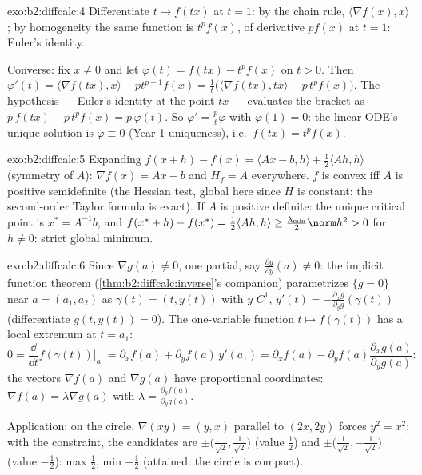 \begin{solution}{exo:b2:diffcalc:4}
Differentiate $t \mapsto f(tx)$ at $t = 1$: by the chain rule,
$\langle \nabla f(x), x\rangle$; by homogeneity the same function
is $t^pf(x)$, of derivative $pf(x)$ at $t = 1$: Euler's identity.

Converse: fix $x \neq 0$ and let $\varphi(t) = f(tx) - t^p f(x)$
on $t > 0$. Then $\varphi'(t) = \langle\nabla f(tx), x\rangle -
pt^{p-1}f(x) = \frac1t\bigl(\langle \nabla f(tx), tx\rangle -
p\,t^pf(x)\bigr)$. The hypothesis --- Euler's identity at the point
$tx$ --- evaluates the bracket as $p\,f(tx) - p\,t^pf(x) =
p\,\varphi(t)$. So $\varphi' = \frac{p}{t}\varphi$ with $\varphi(1)
= 0$: the linear ODE's unique solution is $\varphi \equiv 0$ (Year
1 uniqueness), i.e.\ $f(tx) = t^pf(x)$.
\end{solution}

\begin{solution}{exo:b2:diffcalc:5}
Expanding $f(x + h) - f(x) = \langle Ax - b, h\rangle +
\frac12\langle Ah, h\rangle$ (symmetry of $A$): $\nabla f(x) = Ax -
b$ and $H_f = A$ everywhere. $f$ is convex iff $A$ is positive
semidefinite (the Hessian test, global here since $H$ is constant:
the second-order Taylor formula is exact). If $A$ is positive
definite: the unique critical point is $x^* = A^{-1}b$, and $f(x^*
+ h) - f(x^*) = \frac12\langle Ah, h\rangle \geq
\frac{\lambda_{\min}}{2}\norm h^2 > 0$ for $h \neq 0$: strict
global minimum.
\end{solution}

\begin{solution}{exo:b2:diffcalc:6}
Since $\nabla g(a) \neq 0$, one partial, say $\frac{\partial
g}{\partial y}(a) \neq 0$: the implicit function theorem
(\cref{thm:b2:diffcalc:inverse}'s companion) parametrizes $\{g =
0\}$ near $a = (a_1, a_2)$ as $\gamma(t) = (t, y(t))$ with $y$
$C^1$, $y'(t) = -\frac{\partial_x g}{\partial_y g}(\gamma(t))$
(differentiate $g(t, y(t)) = 0$). The one-variable function $t
\mapsto f(\gamma(t))$ has a local extremum at $t = a_1$:
\[
0 = \frac{\dd}{\dd t}f(\gamma(t))\Big|_{a_1}
= \partial_x f(a) + \partial_y f(a)\,y'(a_1)
= \partial_x f(a) - \partial_yf(a)\frac{\partial_x
g(a)}{\partial_y g(a)} :
\]
the vectors $\nabla f(a)$ and $\nabla g(a)$ have proportional
coordinates: $\nabla f(a) = \lambda \nabla g(a)$ with $\lambda =
\frac{\partial_y f(a)}{\partial_y g(a)}$.

Application: on the circle, $\nabla(xy) = (y, x)$ parallel to
$(2x, 2y)$ forces $y^2 = x^2$; with the constraint, the candidates
are $\pm\bigl(\tfrac{1}{\sqrt2}, \tfrac{1}{\sqrt2}\bigr)$ (value
$\frac12$) and $\pm\bigl(\tfrac{1}{\sqrt2},
-\tfrac{1}{\sqrt2}\bigr)$ (value $-\frac12$): max $\frac12$, min
$-\frac12$ (attained: the circle is compact).
\end{solution}

